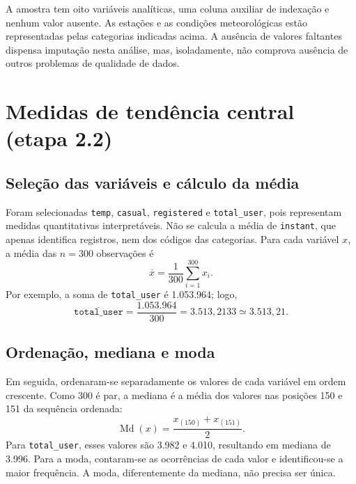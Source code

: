 \documentclass[12pt,a4paper]{article}
\begin{document}
A amostra tem oito variáveis analíticas, uma coluna auxiliar de indexação e
nenhum valor ausente. As estações e as condições meteorológicas estão
representadas pelas categorias indicadas acima. A ausência de valores
faltantes dispensa imputação nesta análise, mas, isoladamente, não comprova
ausência de outros problemas de qualidade de dados.

\section{Medidas de tendência central (etapa 2.2)}

\subsection{Seleção das variáveis e cálculo da média}

Foram selecionadas \texttt{temp}, \texttt{casual}, \texttt{registered} e
\texttt{total\_user}, pois representam medidas quantitativas interpretáveis.
Não se calcula a média de \texttt{instant}, que apenas identifica registros,
nem dos códigos das categorias. Para cada variável $x$, a média das
$n=300$ observações é
\begin{equation}
\overline{x}=\frac{1}{300}\sum_{i=1}^{300}x_i.
\end{equation}
Por exemplo, a soma de \texttt{total\_user} é 1.053.964; logo,
\begin{equation}
\overline{\texttt{total\_user}}=
\frac{1.053.964}{300}=3.513{,}2133\simeq 3.513{,}21.
\end{equation}

\subsection{Ordenação, mediana e moda}

Em seguida, ordenaram-se separadamente os valores de cada variável em ordem
crescente. Como 300 é par, a mediana é a média dos valores nas posições 150 e
151 da sequência ordenada:
\begin{equation}
\operatorname{Md}(x)=\frac{x_{(150)}+x_{(151)}}{2}.
\end{equation}
Para \texttt{total\_user}, esses valores são 3.982 e 4.010, resultando em
mediana de 3.996. Para a moda, contaram-se as ocorrências de cada valor e
identificou-se a maior frequência. A moda, diferentemente da mediana, não
precisa ser única.
\end{document}
